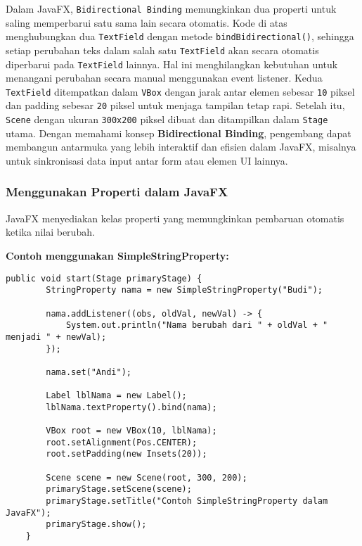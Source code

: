 Dalam JavaFX, \texttt{Bidirectional Binding} memungkinkan dua properti untuk saling memperbarui satu sama lain secara otomatis. Kode di atas menghubungkan dua \texttt{TextField} dengan metode \texttt{bindBidirectional()}, sehingga setiap perubahan teks dalam salah satu \texttt{TextField} akan secara otomatis diperbarui pada \texttt{TextField} lainnya. Hal ini menghilangkan kebutuhan untuk menangani perubahan secara manual menggunakan event listener. Kedua \texttt{TextField} ditempatkan dalam \texttt{VBox} dengan jarak antar elemen sebesar \texttt{10} piksel dan padding sebesar \texttt{20} piksel untuk menjaga tampilan tetap rapi. Setelah itu, \texttt{Scene} dengan ukuran \texttt{300x200} piksel dibuat dan ditampilkan dalam \texttt{Stage} utama. Dengan memahami konsep \textbf{Bidirectional Binding}, pengembang dapat membangun antarmuka yang lebih interaktif dan efisien dalam JavaFX, misalnya untuk sinkronisasi data input antar form atau elemen UI lainnya.


\subsubsection{Menggunakan Properti dalam JavaFX}

JavaFX menyediakan kelas properti yang memungkinkan pembaruan otomatis ketika nilai berubah.

\textbf{Contoh menggunakan SimpleStringProperty:}
\begin{lstlisting}[style=JavaStyle, caption=Penggunaan SimpleStringProperty]
	public void start(Stage primaryStage) {
		StringProperty nama = new SimpleStringProperty("Budi");
		
		nama.addListener((obs, oldVal, newVal) -> {
			System.out.println("Nama berubah dari " + oldVal + " menjadi " + newVal);
		});
		
		nama.set("Andi");
		
		Label lblNama = new Label();
		lblNama.textProperty().bind(nama);
		
		VBox root = new VBox(10, lblNama);
		root.setAlignment(Pos.CENTER);
		root.setPadding(new Insets(20));
		
		Scene scene = new Scene(root, 300, 200);
		primaryStage.setScene(scene);
		primaryStage.setTitle("Contoh SimpleStringProperty dalam JavaFX");
		primaryStage.show();
	}
\end{lstlisting}


